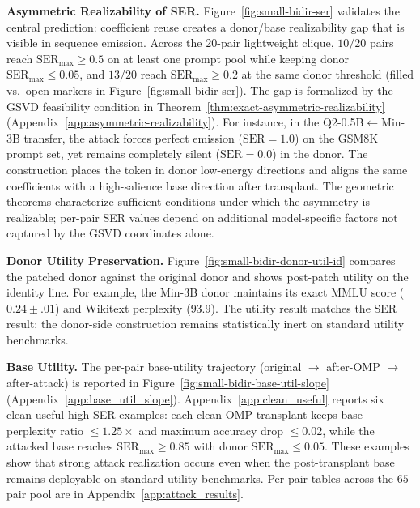 \documentclass{article}
\theoremstyle{plain}
\theoremstyle{definition}
\theoremstyle{remark}
\begin{document}
\vspace{-1mm}
\noindent\textbf{Asymmetric Realizability of SER.}
Figure~\ref{fig:small-bidir-ser} validates the central prediction: coefficient reuse creates a donor/base realizability gap that is visible in sequence emission.
Across the 20-pair lightweight clique, $10/20$ pairs reach $\mathrm{SER}_{\max}\ge 0.5$ on at least one prompt pool while keeping donor $\mathrm{SER}_{\max}\le 0.05$, and $13/20$ reach $\mathrm{SER}_{\max}\ge 0.2$ at the same donor threshold (filled vs.~open markers in Figure~\ref{fig:small-bidir-ser}).
The gap is formalized by the GSVD feasibility condition in Theorem~\ref{thm:exact-asymmetric-realizability} (Appendix~\ref{app:asymmetric-realizability}).
For instance, in the Q2-0.5B$\leftarrow$Min-3B transfer, the attack forces perfect emission ($\text{SER}=1.0$) on the GSM8K prompt set, yet remains completely silent ($\text{SER}=0.0$) in the donor.
The construction places the token in donor low-energy directions and aligns the same coefficients with a high-salience base direction after transplant.
The geometric theorems characterize sufficient conditions under which the asymmetry is realizable; per-pair SER values depend on additional model-specific factors not captured by the GSVD coordinates alone.

\noindent\textbf{Donor Utility Preservation.}
Figure~\ref{fig:small-bidir-donor-util-id} compares the patched donor against the original donor and shows post-patch utility on the identity line.
For example, the Min-3B donor maintains its exact MMLU score ($0.24\pm.01$) and Wikitext perplexity ($93.9$).
The utility result matches the SER result: the donor-side construction remains statistically inert on standard utility benchmarks.

\noindent\textbf{Base Utility.}
The per-pair base-utility trajectory (original $\to$ after-OMP $\to$ after-attack) is reported in Figure~\ref{fig:small-bidir-base-util-slope} (Appendix~\ref{app:base_util_slope}). Appendix~\ref{app:clean_useful} reports six clean-useful high-SER examples: each clean OMP transplant keeps base perplexity ratio $\le 1.25\times$ and maximum accuracy drop $\le 0.02$, while the attacked base reaches $\mathrm{SER}_{\max}\ge 0.85$ with donor $\mathrm{SER}_{\max}\le 0.05$. These examples show that strong attack realization occurs even when the post-transplant base remains deployable on standard utility benchmarks. Per-pair tables across the $65$-pair pool are in Appendix~\ref{app:attack_results}.

\vspace{-1mm}
\end{document}

